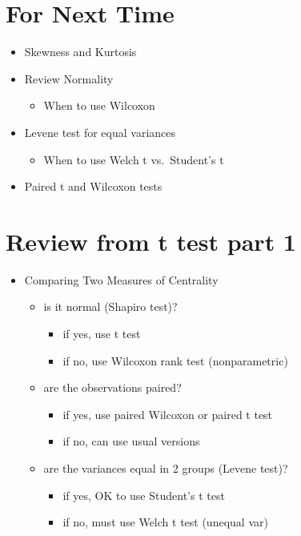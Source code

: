 \documentclass[
]{book}
\providecommand{\tightlist}{%
  \setlength{\itemsep}{0pt}\setlength{\parskip}{0pt}}
\begin{document}
\hypertarget{for-next-time-1}{%
\section{For Next Time}\label{for-next-time-1}}

\begin{itemize}
\tightlist
\item
  Skewness and Kurtosis
\item
  Review Normality

  \begin{itemize}
  \tightlist
  \item
    When to use Wilcoxon
  \end{itemize}
\item
  Levene test for equal variances

  \begin{itemize}
  \tightlist
  \item
    When to use Welch t vs.~Student's t
  \end{itemize}
\item
  Paired t and Wilcoxon tests
\end{itemize}

\hypertarget{review-from-t-test-part-1}{%
\section{Review from t test part 1}\label{review-from-t-test-part-1}}

\begin{itemize}
\tightlist
\item
  Comparing Two Measures of Centrality

  \begin{itemize}
  \tightlist
  \item
    is it normal (Shapiro test)?

    \begin{itemize}
    \tightlist
    \item
      if yes, use t test
    \item
      if no, use Wilcoxon rank test (nonparametric)
    \end{itemize}
  \item
    are the observations paired?

    \begin{itemize}
    \tightlist
    \item
      if yes, use paired Wilcoxon or paired t test
    \item
      if no, can use usual versions
    \end{itemize}
  \item
    are the variances equal in 2 groups (Levene test)?

    \begin{itemize}
    \tightlist
    \item
      if yes, OK to use Student's t test
    \item
      if no, must use Welch t test (unequal var)
    \end{itemize}
  \end{itemize}
\end{itemize}
\end{document}
